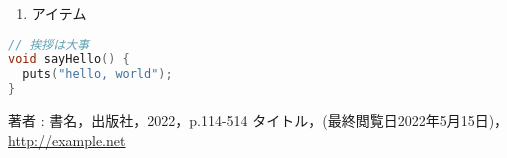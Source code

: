 \documentclass[a4paper]{ltjsarticle}
\newcommand{\maru}[1]{\raisebox{.5pt}{\textcircled{\raisebox{-.9pt}{#1}}}}
\begin{document}
\begin{enumerate}[label=\maru{\arabic*}]
  \item アイテム
\end{enumerate}

\begin{lstlisting}[language=C++, caption=ほげ, label=lst:hoge]
// 挨拶は大事
void sayHello() {
  puts("hello, world");
}
\end{lstlisting}

\begin{thebibliography}{99}
   著者 : 書名，出版社，2022，p.114-514
   タイトル，(最終閲覧日2022年5月15日)，\url{http://example.net}
\end{thebibliography}
\end{document}
